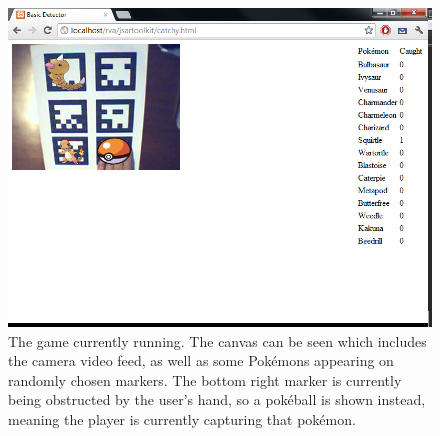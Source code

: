 \begin{figure}
	\begin{center}
		\includegraphics[width=\columnwidth]{report/images/catchy.png}
	\end{center}
	\caption[Game]{The game currently running. The canvas can be seen which includes the camera video feed, as well as some Pokémons appearing on randomly chosen markers. The bottom right marker is currently being obstructed by the user's hand, so a pokéball is shown instead, meaning the player is currently capturing that pokémon.}
	\label{fig:catchy}
\end{figure}



